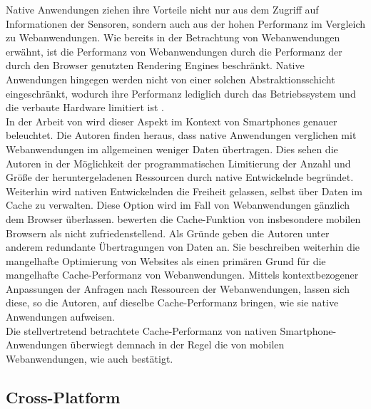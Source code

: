 \documentclass[a4paper]{scrartcl}
\begin{document}
Native Anwendungen ziehen ihre Vorteile nicht nur aus dem Zugriff auf Informationen der Sensoren, sondern auch aus der hohen Performanz im Vergleich zu Webanwendungen. Wie bereits in der Betrachtung von Webanwendungen erwähnt, ist die Performanz von Webanwendungen durch die Performanz der durch den Browser genutzten Rendering Engines beschränkt. Native Anwendungen hingegen werden nicht von einer solchen Abstraktionsschicht eingeschränkt, wodurch ihre Performanz lediglich durch das Betriebssystem und die verbaute Hardware limitiert ist \autocite[28]{Jobe}. \\
In der Arbeit von \textcite[999]{native_vs_web} wird dieser Aspekt im Kontext von Smartphones genauer beleuchtet. Die Autoren finden heraus, dass native Anwendungen verglichen mit Webanwendungen im allgemeinen weniger Daten übertragen. Dies sehen die Autoren in der Möglichkeit der programmatischen Limitierung der Anzahl und Größe der heruntergeladenen Ressourcen durch native Entwickelnde begründet. Weiterhin wird nativen Entwickelnden die Freiheit gelassen, selbst über Daten im Cache zu verwalten. Diese Option wird im Fall von Webanwendungen gänzlich dem Browser überlassen. \textcite[999]{native_vs_web} bewerten die Cache-Funktion von insbesondere mobilen Browsern als nicht zufriedenstellend. Als Gründe geben die Autoren unter anderem redundante Übertragungen von Daten an. Sie beschreiben weiterhin die mangelhafte Optimierung von Websites als einen primären Grund für die mangelhafte Cache-Performanz von Webanwendungen. Mittels kontextbezogener Anpassungen der Anfragen nach Ressourcen der Webanwendungen, lassen sich diese, so die Autoren, auf dieselbe Cache-Performanz bringen, wie sie native Anwendungen aufweisen. \\
Die stellvertretend betrachtete Cache-Performanz von nativen Smartphone-Anwendungen überwiegt demnach in der Regel die von mobilen Webanwendungen, wie auch \textcite[1]{Beyond_native_apps} bestätigt.

\newpage

\subsection{Cross-Platform}
\end{document}
